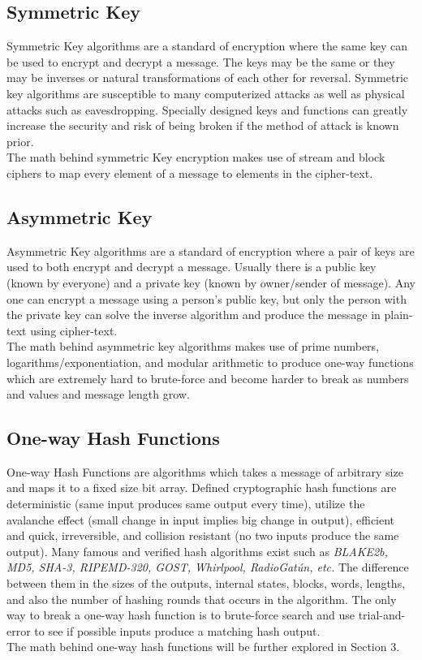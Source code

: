 \documentclass[12pt]{extarticle}
\begin{document}
\subsection{Symmetric Key}
Symmetric Key algorithms are a standard of encryption where the same key can be used to encrypt and decrypt a message. The keys may be the same or they may be inverses or natural transformations of each other for reversal. Symmetric key algorithms are susceptible to many computerized attacks as well as physical attacks such as eavesdropping. Specially designed keys and functions can greatly increase the security and risk of being broken if the method of attack is known prior.\cite{src2}\cite{src6}\cite{src7}\\
The math behind symmetric Key encryption makes use of stream and block ciphers to map every element of a message to elements in the cipher-text. 
\subsection{Asymmetric Key}
Asymmetric Key algorithms are a standard of encryption where a pair of keys are used to both encrypt and decrypt a message. Usually there is a public key (known by everyone) and a private key (known by owner/sender of message). Any one can encrypt a message using a person's public key, but only the person with the private key can solve the inverse algorithm and produce the message in plain-text using cipher-text.\cite{src7}\\
The math behind asymmetric key algorithms makes use of prime numbers, logarithms/exponentiation, and modular arithmetic to produce one-way functions which are extremely hard to brute-force and become harder to break as numbers and values and message length grow.
\subsection{One-way Hash Functions}
One-way Hash Functions are algorithms which takes a message of arbitrary size and maps it to a fixed size bit array. Defined cryptographic hash functions are deterministic (same input produces same output every time), utilize the avalanche effect (small change in input implies big change in output), efficient and quick, irreversible, and collision resistant (no two inputs produce the same output). Many famous and verified hash algorithms exist such as {\slshape{BLAKE2b, MD5, SHA-3, RIPEMD-320, GOST, Whirlpool, RadioGatún, etc.}} The difference between them in the sizes of the outputs, internal states, blocks, words, lengths, and also the number of hashing rounds that occurs in the algorithm. The only way to break a one-way hash function is to brute-force search and use trial-and-error to see if possible inputs produce a matching hash output.\cite{src5}\cite{src6}\cite{src7}\\
The math behind one-way hash functions will be further explored in Section 3.
\end{document}
